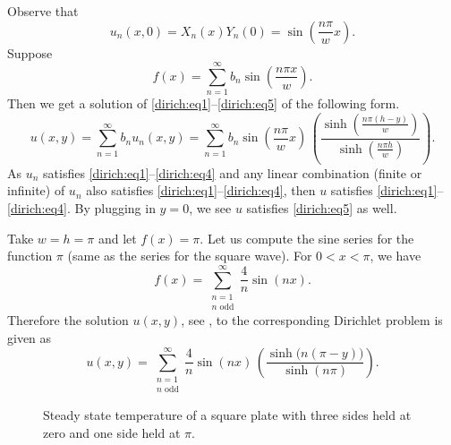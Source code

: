\documentclass[12pt]{book}
\begin{document}
Observe that
\begin{equation*}
u_n(x,0) = X_n(x)Y_n(0) = \sin \left( \frac{n \pi}{w} x \right) .
\end{equation*}
Suppose
\begin{equation*}
f(x) =
\sum_{n=1}^\infty
b_n \sin \left( \frac{n \pi x }{w} \right) .
\end{equation*}
Then we get a solution of \eqref{dirich:eq1}--\eqref{dirich:eq5} of the
following form.
\begin{equation*}
\boxed{
~~
u(x,y) =
\sum_{n=1}^\infty
b_n u_n(x,y)
=
\sum_{n=1}^\infty
b_n 
\sin \left( \frac{n \pi}{w} x \right)
\, \left( \frac{\sinh \left( \frac{n \pi (h-y) }{w} \right)}%
{\sinh \left( \frac{n \pi h }{w} \right)} \right)
.
~~
}
\end{equation*}
As $u_n$ satisfies \eqref{dirich:eq1}--\eqref{dirich:eq4} and any linear
combination (finite or infinite) of $u_n$ also satisfies 
\eqref{dirich:eq1}--\eqref{dirich:eq4}, then $u$ satisfies
\eqref{dirich:eq1}--\eqref{dirich:eq4}.
By plugging in $y=0$, we see $u$
satisfies 
\eqref{dirich:eq5} as well.

\begin{example}
Take $w=h=\pi$ and let $f(x) = \pi$.  Let us compute the sine
series for the function $\pi$ (same as the series for the square wave).
For $0 < x < \pi$, we have
\begin{equation*}
f(x) =
\sum_{\substack{n=1 \\ n \text{ odd}}}^\infty
\frac{4}{n}
\sin (n x) .
\end{equation*}
Therefore the solution $u(x,y)$, see ,
to the corresponding Dirichlet problem is
given as
\begin{equation*}
u(x,y) =
\sum_{\substack{n=1 \\ n \text{ odd}}}^\infty
\frac{4}{n}
\sin (n x)
\,\left( \frac{\sinh \bigl( n (\pi-y) \bigr) }{\sinh (n \pi)} \right)
.
\end{equation*}

\begin{figure}[h!t]
\capstart
\begin{center}
\caption{Steady state temperature of a square plate with three sides
held at zero and one side held at $\pi$.\label{dirichsquareplot:fig}}
\end{center}
\end{figure}
\end{example}
\end{document}
